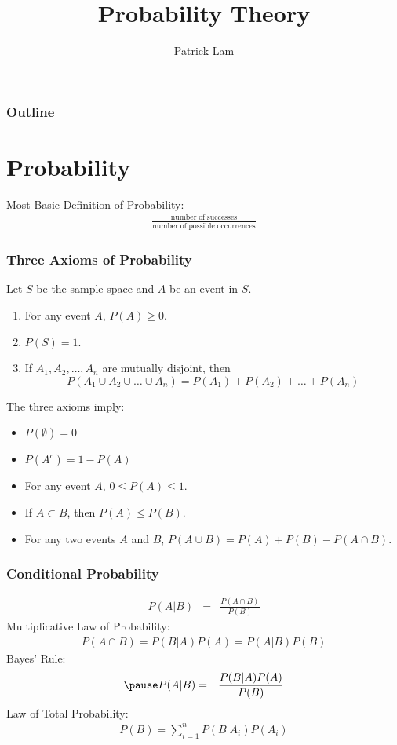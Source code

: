 \documentclass[handout]{beamer}
\author{Patrick Lam}
\title{Probability Theory}
\date{}
\begin{document}
\newcommand{\red}{\textcolor{red}}
\newcommand{\blue}{\textcolor{blue}}
\newcommand{\purple}{\textcolor{purple}}

\frame{\titlepage}

\begin{frame}
\frametitle{Outline}
\tableofcontents
\end{frame}


\section{Probability}

\begin{frame}
Most Basic Definition of Probability:
\pause
\bigskip
\begin{eqnarray*}
\frac{\mathrm{number \; of \; successes}}{\mathrm{number \; of \; possible \; occurrences}}
\end{eqnarray*}
\end{frame}

\begin{frame}
\frametitle{Three Axioms of Probability}
\pause
Let $S$ be the sample space and $A$ be an event in $S$.
\pause
\medskip
\begin{enumerate}
\item For any event $A$, $P(A) \ge 0$.
\pause
\item $P(S) = 1$.
\pause
\item If $A_1, A_2, \dots, A_n$ are mutually disjoint, then
\begin{equation*}
P(A_1 \cup A_2 \cup \dots \cup A_n) = P(A_1) + P(A_2) + \dots + P(A_n)
\end{equation*}
\end{enumerate}
\pause
The three axioms imply:
\pause
\begin{itemize}
\item $P(\emptyset) = 0$
\pause
\item $P(A^c) = 1 - P(A)$
\pause
\item For any event $A$, $0 \le P(A) \le 1$.
\pause
\item If $A \subset B$, then $P(A) \le P(B)$.
\pause
\item For any two events $A$ and $B$, $P(A \cup B) = P(A) + P(B) - P(A
\cap B)$.
\end{itemize}
\end{frame}

\begin{frame}
\frametitle{Conditional Probability}
\pause
\begin{eqnarray*}
P(A|B) &=& \frac{P(A \cap B)}{P(B)} 
\end{eqnarray*}
\pause
Multiplicative Law of Probability:
\pause
\begin{eqnarray*}
P(A \cap B) = P(B|A) P(A) = P(A|B) P(B)
\end{eqnarray*}
\pause
Bayes' Rule:
\begin{eqnarray*}
\pause
P(A|B) &=& \frac{P(B|A) P(A)}{P(B)}
\end{eqnarray*}
\pause
Law of Total Probability:
\pause
\begin{eqnarray*}
P(B) = \sum_{i=1}^n P(B|A_i) P(A_i)
\end{eqnarray*}
\end{frame}
\end{document}

